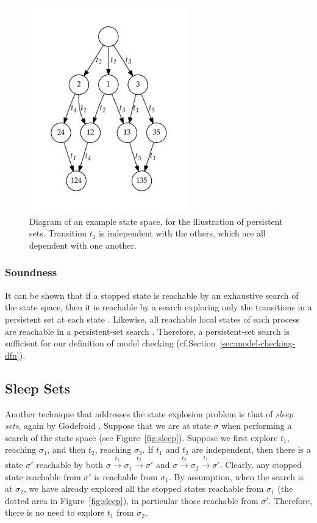 \documentclass[12pt,a4paper,twoside,openright]{report}
\begin{document}
\begin{figure}
	\centering
	\includegraphics[height=9cm]{persistent1}
	\caption[Diagram of an example state space, for
	the illustration of persistent sets.]
		{Diagram of an example state space, for
		the illustration of persistent sets. Transition
		$t_1$ is independent with the others, which are
		all dependent with one another.}
	\label{fig:persistent}
\end{figure}

\subsubsection{Soundness}
It can be shown that if a stopped
state is reachable by an exhaustive
search of the state space, then
it is reachable by a search exploring
only the transitions in a persistent set
at each state \cite[Theorem~4.3]{god96}.
Likewise, all reachable
local states of each process are reachable
in a persistent-set search
\cite[Theorem~6.14]{god96}.
Therefore,
a persistent-set search is sufficient for
our definition of model checking
(cf.\@ Section~\ref{sec:model-checking-dfn}).

\subsection{Sleep Sets}
\label{sec:sleep-prep}
Another technique that addresses
the state explosion problem is
that of \emph{sleep sets}, again by Godefroid \cite{god91}.
Suppose that
we are at state $\sigma$ when performing a search
of the state space (see Figure~\ref{fig:sleep}).
Suppose we first explore $t_1$, reaching $\sigma_1$,
and then $t_2$, reaching $\sigma_2$.
If $t_1$ and $t_2$ are independent, then there
is a state $\sigma'$ reachable by both
$\sigma \xrightarrow{t_1} \sigma_1
\xrightarrow{t_2} \sigma'$ and
$\sigma \xrightarrow{t_2} \sigma_2
\xrightarrow{t_1} \sigma'$.
Clearly, any stopped state reachable from $\sigma'$
is reachable from $\sigma_1$. By assumption,
when the search is at $\sigma_2$, we have already
explored all the stopped states reachable from
$\sigma_1$ (the dotted area in Figure~\ref{fig:sleep}),
in particular those reachable from
$\sigma'$. Therefore, there is no need to
explore $t_1$ from $\sigma_2$.
\end{document}
